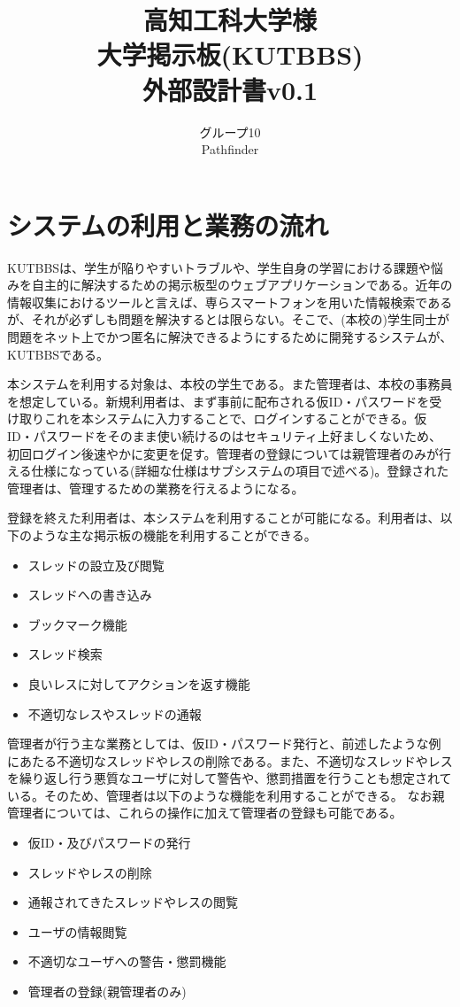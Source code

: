 \documentclass[a4j]{jarticle}
\title{
\vspace{30mm}
{\bf 高知工科大学様}
\\
\vspace{5mm}
大学掲示板(KUTBBS)\\
\vspace{5mm}
{\bf  外部設計書v0.1}
\vspace{90mm}
}
\author{
\vspace{5mm}
グループ10 \\
\vspace{5mm}
Pathfinder \\
\vspace{5mm}
\vspace{10mm}
}
\begin{document}
\maketitle
\tableofcontents
\newpage




\section{システムの利用と業務の流れ}
KUTBBSは、学生が陥りやすいトラブルや、学生自身の学習における課題や悩みを自主的に解決するための掲示板型のウェブアプリケーションである。近年の情報収集におけるツールと言えば、専らスマートフォンを用いた情報検索であるが、それが必ずしも問題を解決するとは限らない。そこで、(本校の)学生同士が問題をネット上でかつ匿名に解決できるようにするために開発するシステムが、KUTBBSである。



本システムを利用する対象は、本校の学生である。また管理者は、本校の事務員を想定している。新規利用者は、まず事前に配布される仮ID・パスワードを受け取りこれを本システムに入力することで、ログインすることができる。仮ID・パスワードをそのまま使い続けるのはセキュリティ上好ましくないため、初回ログイン後速やかに変更を促す。管理者の登録については親管理者のみが行える仕様になっている(詳細な仕様はサブシステムの項目で述べる)。登録された管理者は、管理するための業務を行えるようになる。


登録を終えた利用者は、本システムを利用することが可能になる。利用者は、以下のような主な掲示板の機能を利用することができる。
\begin{itemize}
  \item スレッドの設立及び閲覧
  \item スレッドへの書き込み
  \item ブックマーク機能
  \item スレッド検索
  \item 良いレスに対してアクションを返す機能
  \item 不適切なレスやスレッドの通報
\end{itemize}



管理者が行う主な業務としては、仮ID・パスワード発行と、前述したような例にあたる不適切なスレッドやレスの削除である。また、不適切なスレッドやレスを繰り返し行う悪質なユーザに対して警告や、懲罰措置を行うことも想定されている。そのため、管理者は以下のような機能を利用することができる。
なお親管理者については、これらの操作に加えて管理者の登録も可能である。

\begin{itemize}
  \item 仮ID・及びパスワードの発行
  \item スレッドやレスの削除
  \item 通報されてきたスレッドやレスの閲覧
  \item ユーザの情報閲覧
  \item 不適切なユーザへの警告・懲罰機能
  \item 管理者の登録(親管理者のみ)
\end{itemize}
\end{document}
